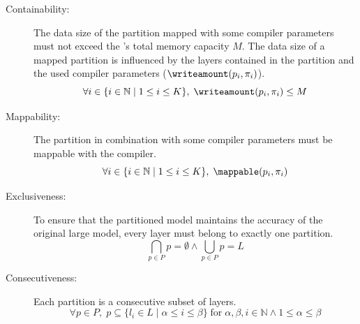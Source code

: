 \begin{description}
    \item[Containability:]
    The data size of the partition mapped with some compiler parameters must not exceed the \graicore{}'s total memory capacity $M$.
        The data size of a mapped partition is influenced by the layers contained in the partition and the used compiler parameters ($\writeamount(p_i, \pi_i)$).
    \begin{equation}
        \forall i \in \{i \in \mathbb{N} \mid 1 \leq i \leq K\}, \; \writeamount(p_i, \pi_i) \leq M
    \end{equation}
    \item[Mappability:]
    The partition in combination with some compiler parameters must be mappable with the compiler.
    \begin{equation}
        \forall i \in \{i \in \mathbb{N} \mid 1 \leq i \leq K\}, \; \mappable(p_i, \pi_i)
    \end{equation}
    \item[Exclusiveness:]
    To ensure that the partitioned model maintains the accuracy of the original large model, every layer must belong to exactly one partition.
    \begin{equation}
        \bigcap_{p \in P} p = \emptyset \wedge \bigcup_{p \in P}p = L
    \end{equation}
    \item[Consecutiveness:]
    Each partition is a consecutive subset of layers.
    \begin{equation}
        \forall p \in P, \; p \subseteq \{l_i \in L \mid \alpha \leq i \leq \beta\} \; \text{for} \;  \alpha, \beta, i \in \mathbb{N} \wedge 1 \leq \alpha \leq \beta
    \end{equation}

\end{description}
